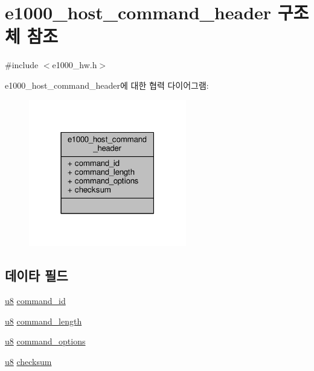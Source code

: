 \hypertarget{structe1000__host__command__header}{}\section{e1000\+\_\+host\+\_\+command\+\_\+header 구조체 참조}
\label{structe1000__host__command__header}


{\ttfamily \#include $<$e1000\+\_\+hw.\+h$>$}



e1000\+\_\+host\+\_\+command\+\_\+header에 대한 협력 다이어그램\+:
\nopagebreak
\begin{figure}[H]
\begin{center}
\leavevmode
\includegraphics[width=195pt]{structe1000__host__command__header__coll__graph}
\end{center}
\end{figure}
\subsection*{데이타 필드}
\begin{DoxyCompactItemize}
\item 
\hyperlink{lib_2igb_2e1000__osdep_8h_a8baca7e76da9e0e11ce3a275dd19130c}{u8} \hyperlink{structe1000__host__command__header_aa5d253518ff72b4ed6148c872420aa46}{command\+\_\+id}
\item 
\hyperlink{lib_2igb_2e1000__osdep_8h_a8baca7e76da9e0e11ce3a275dd19130c}{u8} \hyperlink{structe1000__host__command__header_a4e35eba0d058e74d505908ac29e5e8bf}{command\+\_\+length}
\item 
\hyperlink{lib_2igb_2e1000__osdep_8h_a8baca7e76da9e0e11ce3a275dd19130c}{u8} \hyperlink{structe1000__host__command__header_a5d5da570ec52b23cfc64a1f80d37f527}{command\+\_\+options}
\item 
\hyperlink{lib_2igb_2e1000__osdep_8h_a8baca7e76da9e0e11ce3a275dd19130c}{u8} \hyperlink{structe1000__host__command__header_afd93107fee98407f162be1294fb053fd}{checksum}
\end{DoxyCompactItemize}


